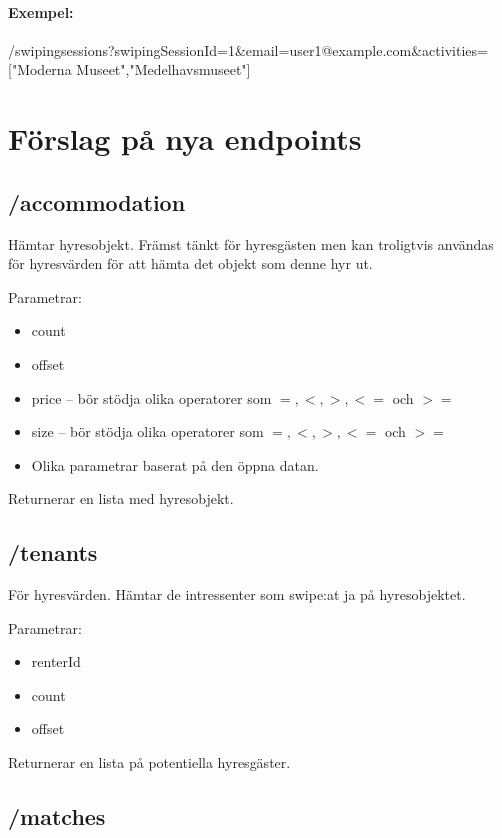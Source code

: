 \documentclass{article}
\begin{document}
\paragraph{Exempel:} /swipingsessions?swipingSessionId=1\&email=user1@example.com\&activities=["Moderna Museet","Medelhavsmuseet"]

\section*{Förslag på nya endpoints}
\label{sec:Förslag på nya endpoints}

\subsection*{/accommodation}
\label{sub:/accommodation}

Hämtar hyresobjekt. Främst tänkt för hyresgästen men kan troligtvis användas för hyresvärden för att hämta det objekt som denne hyr ut.

Parametrar:

\begin{itemize}
    \item count
    \item offset
    \item price -- bör stödja olika operatorer som \(=, <, >, <=\) och \(>=\)
    \item size -- bör stödja olika operatorer som \(=, <, >, <=\) och \(>=\)
    \item Olika parametrar baserat på den öppna datan.
\end{itemize}

Returnerar en lista med hyresobjekt.

\subsection*{/tenants}
\label{sub:/tenants}

För hyresvärden. Hämtar de intressenter som swipe:at ja på hyresobjektet.

Parametrar:

\begin{itemize}
    \item renterId
    \item count
    \item offset
\end{itemize}

Returnerar en lista på potentiella hyresgäster.

\subsection*{/matches}
\label{sub:/matches}
\end{document}
